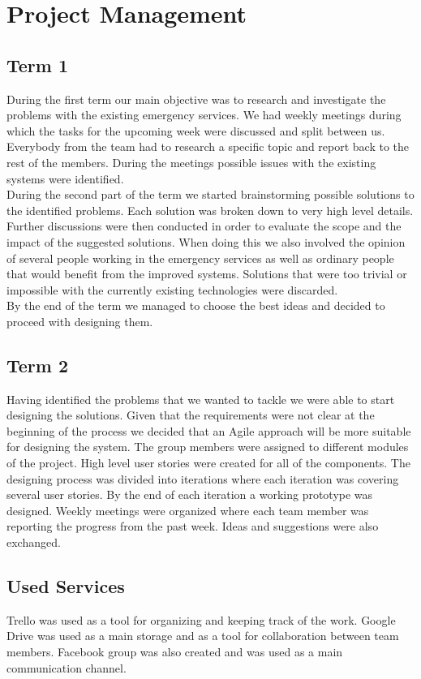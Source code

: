 \documentclass{article}
\begin{document}
\pagebreak
    \section{Project Management}
\subsection{Term 1}
During the first term our main objective was to research and investigate the problems with the existing emergency services. We had weekly meetings during which the tasks for the upcoming week were discussed and split between us. Everybody from the team had to research a specific topic and report back to the rest of the members.
During the meetings possible issues with the existing systems were identified.\\

During the second part of the term we started brainstorming possible solutions to the identified problems. Each solution was broken down to very high level details. Further discussions were then conducted in order to evaluate the scope and the impact of the suggested solutions. When doing this we also involved the opinion of several people working in the emergency services as well as ordinary people that would benefit from the improved systems. Solutions that were too trivial or impossible with the currently existing technologies were discarded. \\ 

By the end of the term we managed to choose the best ideas and decided to proceed with designing them.\\

\subsection{Term 2}

Having identified the problems that we wanted to tackle we were able to start designing the solutions.
Given that the requirements were not clear at the beginning of the process we decided that an Agile approach will be more suitable for designing the system. The group members were assigned to different modules of the project. High level user stories were created for all of the components. The designing process was divided into iterations where each iteration was covering several user stories. By the end of each iteration a working prototype was designed. Weekly meetings were organized where each team member was reporting the progress from the past week. Ideas and suggestions were also exchanged. \\
\subsection{Used Services}

Trello was used as a tool for organizing and keeping track of the work. Google Drive was used as a main storage and as a tool for collaboration between team members. Facebook group was also created and was used as a main communication channel.
\end{document}
